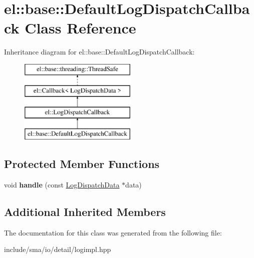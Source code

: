 \hypertarget{classel_1_1base_1_1DefaultLogDispatchCallback}{\section{el\-:\-:base\-:\-:Default\-Log\-Dispatch\-Callback Class Reference}
\label{classel_1_1base_1_1DefaultLogDispatchCallback}
}
Inheritance diagram for el\-:\-:base\-:\-:Default\-Log\-Dispatch\-Callback\-:\begin{figure}[H]
\begin{center}
\leavevmode
\includegraphics[height=4.000000cm]{classel_1_1base_1_1DefaultLogDispatchCallback}
\end{center}
\end{figure}
\subsection*{Protected Member Functions}
\begin{DoxyCompactItemize}
\item 
\hypertarget{classel_1_1base_1_1DefaultLogDispatchCallback_acdac30f202c245500e6d94c55eee6d95}{void {\bfseries handle} (const \hyperlink{classel_1_1LogDispatchData}{Log\-Dispatch\-Data} $\ast$data)}\label{classel_1_1base_1_1DefaultLogDispatchCallback_acdac30f202c245500e6d94c55eee6d95}

\end{DoxyCompactItemize}
\subsection*{Additional Inherited Members}


The documentation for this class was generated from the following file\-:\begin{DoxyCompactItemize}
\item 
include/sma/io/detail/logimpl.\-hpp\end{DoxyCompactItemize}
